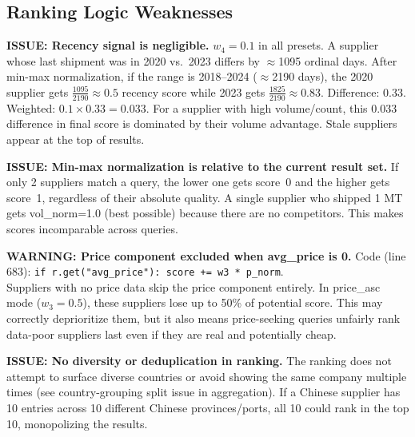 \documentclass[12pt,a4paper]{article}
\begin{document}
\subsection{Ranking Logic Weaknesses}

\begin{issueBox}
\textbf{ISSUE: Recency signal is negligible.}
$w_4 = 0.1$ in all presets. A supplier whose last shipment was in 2020 vs.\ 2023 differs
by $\approx$1095 ordinal days. After min-max normalization, if the range is 2018--2024
($\approx$2190 days), the 2020 supplier gets $\frac{1095}{2190} \approx 0.5$ recency
score while 2023 gets $\frac{1825}{2190} \approx 0.83$. Difference: 0.33. Weighted:
$0.1 \times 0.33 = 0.033$. For a supplier with high volume/count, this 0.033 difference
in final score is dominated by their volume advantage. Stale suppliers appear at the
top of results.
\end{issueBox}

\begin{issueBox}
\textbf{ISSUE: Min-max normalization is relative to the current result set.}
If only 2 suppliers match a query, the lower one gets score~0 and the higher gets
score~1, regardless of their absolute quality. A single supplier who shipped 1 MT gets
vol\_norm=1.0 (best possible) because there are no competitors. This makes scores
incomparable across queries.
\end{issueBox}

\begin{warnBox}
\textbf{WARNING: Price component excluded when avg\_price is 0.}
Code (line 683): \texttt{if r.get("avg\_price"): score += w3 * p\_norm}. \\
Suppliers with no price data skip the price component entirely. In price\_asc mode
($w_3 = 0.5$), these suppliers lose up to 50\% of potential score. This may correctly
deprioritize them, but it also means price-seeking queries unfairly rank data-poor
suppliers last even if they are real and potentially cheap.
\end{warnBox}

\begin{issueBox}
\textbf{ISSUE: No diversity or deduplication in ranking.}
The ranking does not attempt to surface diverse countries or avoid showing the same
company multiple times (see country-grouping split issue in aggregation). If a Chinese
supplier has 10 entries across 10 different Chinese provinces/ports, all 10 could rank
in the top 10, monopolizing the results.
\end{issueBox}
\end{document}
